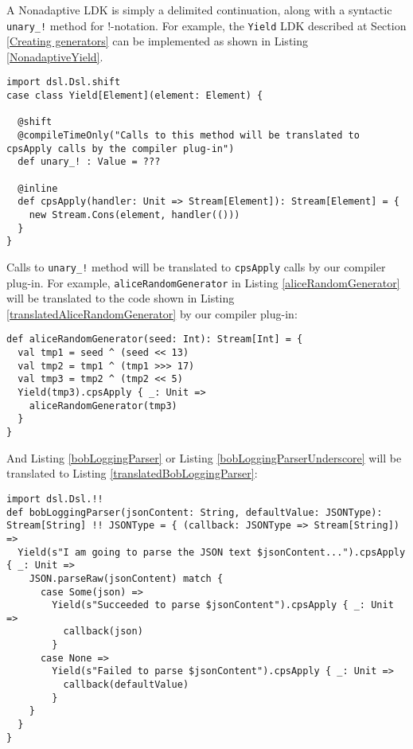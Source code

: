A Nonadaptive LDK is simply a delimited continuation, along with a syntactic \lstinline{unary_!} method for !-notation. For example, the \lstinline{Yield} LDK described at Section \ref{Creating generators} can be implemented as shown in Listing \ref{NonadaptiveYield}.

\begin{lstlisting}[caption={The \lstinline{Yield} LDK, the nonadaptive version},label={NonadaptiveYield}]
import dsl.Dsl.shift
case class Yield[Element](element: Element) {

  @shift
  @compileTimeOnly("Calls to this method will be translated to cpsApply calls by the compiler plug-in")
  def unary_! : Value = ???

  @inline
  def cpsApply(handler: Unit => Stream[Element]): Stream[Element] = {
    new Stream.Cons(element, handler(()))
  }
}
\end{lstlisting}

Calls to \lstinline{unary_!} method will be translated to \lstinline{cpsApply} calls by our compiler plug-in. For example, \lstinline{aliceRandomGenerator} in Listing \ref{aliceRandomGenerator} will be translated to the code shown in Listing \ref{translatedAliceRandomGenerator} by our compiler plug-in:

\begin{lstlisting}[caption={The translated code for Alice's pseudo-random number generator},label={translatedAliceRandomGenerator}]
def aliceRandomGenerator(seed: Int): Stream[Int] = {
  val tmp1 = seed ^ (seed << 13)
  val tmp2 = tmp1 ^ (tmp1 >>> 17)
  val tmp3 = tmp2 ^ (tmp2 << 5)
  Yield(tmp3).cpsApply { _: Unit =>
    aliceRandomGenerator(tmp3)
  }
}
\end{lstlisting}

And Listing \ref{bobLoggingParser} or Listing \ref{bobLoggingParserUnderscore} will be translated to Listing \ref{translatedBobLoggingParser}:

\begin{lstlisting}[caption={The translated code for Bob's parser},label={translatedBobLoggingParser}]
import dsl.Dsl.!!
def bobLoggingParser(jsonContent: String, defaultValue: JSONType): Stream[String] !! JSONType = { (callback: JSONType => Stream[String]) =>
  Yield(s"I am going to parse the JSON text $jsonContent...").cpsApply { _: Unit =>
    JSON.parseRaw(jsonContent) match {
      case Some(json) =>
        Yield(s"Succeeded to parse $jsonContent").cpsApply { _: Unit =>
          callback(json)
        }
      case None =>
        Yield(s"Failed to parse $jsonContent").cpsApply { _: Unit =>
          callback(defaultValue)
        }
    }
  }
}
\end{lstlisting}

